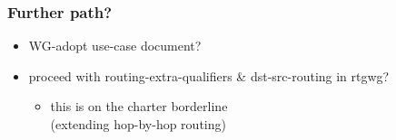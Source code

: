 \documentclass[14pt]{beamer}
\begin{document}
\begin{frame}
  \frametitle{Further path?}
  \begin{itemize}
    \item WG-adopt use-case document?
    \item proceed with routing-extra-qualifiers \& dst-src-routing in rtgwg?
    \begin{itemize}
      \item this is on the charter borderline\\(extending hop-by-hop routing)
    \end{itemize}
  \end{itemize}
\end{frame}
\end{document}
